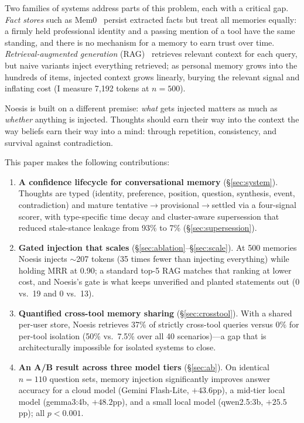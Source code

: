 \documentclass[11pt]{article}
\begin{document}
Two families of systems address parts of this problem, each with a critical
gap. \emph{Fact stores} such as Mem0~\citep{mem0} persist extracted facts but
treat all memories equally: a firmly held professional identity and a
passing mention of a tool have the same standing, and there is no mechanism
for a memory to earn trust over time. \emph{Retrieval-augmented generation}
(RAG)~\citep{lewis2020rag} retrieves relevant context for each query, but
naive variants inject everything retrieved; as personal memory grows into
the hundreds of items, injected context grows linearly, burying the relevant
signal and inflating cost (I measure 7{,}192 tokens at $n{=}500$).

Noesis is built on a different premise: \emph{what} gets injected matters as
much as \emph{whether} anything is injected. Thoughts should earn their way
into the context the way beliefs earn their way into a mind: through
repetition, consistency, and survival against contradiction.

This paper makes the following contributions:

\begin{enumerate}
  \item \textbf{A confidence lifecycle for conversational memory}
  (\S\ref{sec:system}). Thoughts are typed (identity, preference, position,
  question, synthesis, event, contradiction) and mature
  tentative$\to$\allowbreak provisional$\to$\allowbreak settled via a four-signal scorer, with
  type-specific time decay and cluster-aware supersession that reduced
  stale-stance leakage from 93\% to 7\% (\S\ref{sec:supersession}).
  \item \textbf{Gated injection that scales}
  (\S\ref{sec:ablation}--\S\ref{sec:scale}). At 500 memories Noesis injects
  $\sim$207 tokens (35 times fewer than injecting everything) while holding
  MRR at 0.90; a standard top-5 RAG matches that ranking at lower cost, and
  Noesis's gate is what keeps unverified and planted statements out (0 vs.\
  19 and 0 vs.\ 13).
  \item \textbf{Quantified cross-tool memory sharing} (\S\ref{sec:crosstool}).
  With a shared per-user store, Noesis retrieves 37\% of strictly cross-tool
  queries versus 0\% for per-tool isolation (50\% vs.\ 7.5\% over all 40
  scenarios)---a gap that is architecturally impossible for isolated systems
  to close.
  \item \textbf{An A/B result across three model tiers}
  (\S\ref{sec:ab}). On identical $n{=}110$ question sets, memory injection
  significantly improves answer accuracy for a cloud model (Gemini
  Flash-Lite, $+43.6$pp), a mid-tier local model (gemma3:4b, $+48.2$pp), and
  a small local model (qwen2.5:3b, $+25.5$pp); all $p<0.001$.
\end{enumerate}
\end{document}
